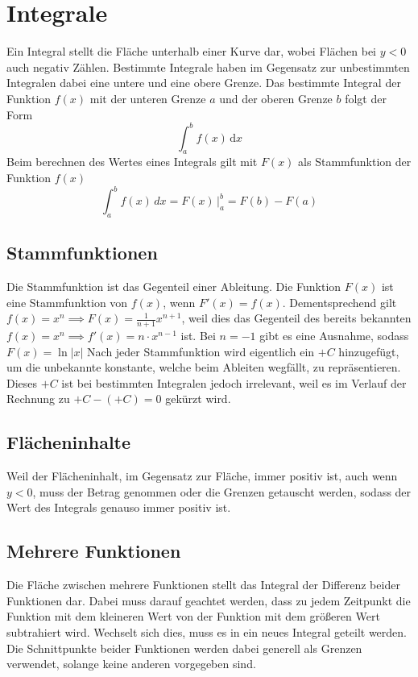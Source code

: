 \documentclass{article}
\begin{document}
 
\section{Integrale}
Ein Integral stellt die Fläche unterhalb einer Kurve dar, wobei Flächen bei $y<0$ auch negativ Zählen. Bestimmte Integrale haben im Gegensatz zur unbestimmten Integralen dabei eine untere und eine obere Grenze. Das bestimmte Integral der Funktion $f(x)$ mit der unteren Grenze $a$ und der oberen Grenze $b$ folgt der Form 
\[
 \int_a^b f(x) \,\mathrm{d}x
\]
Beim berechnen des Wertes eines Integrals gilt mit $F(x)$ als Stammfunktion der Funktion $f(x)$
\[
 \int_a^b f(x) \,dx =
 F(x) \,\Bigr|_a^b =
 F(b) - F(a)
\] 
 
\subsection{Stammfunktionen}
Die Stammfunktion ist das Gegenteil einer Ableitung. Die Funktion $F(x)$ ist eine Stammfunktion von $f(x)$, wenn $F'(x) = f(x)$.
Dementsprechend gilt $f(x)=x^n \implies F(x)=\frac{1}{n+1}x^{n+1}$, weil dies das Gegenteil des bereits bekannten $f(x)=x^n \implies f'(x)=n \cdot x^{n-1}$ ist. Bei $n=-1$ gibt es eine Ausnahme, sodass $F(x)=\ln|x|$ \newline
Nach jeder Stammfunktion wird eigentlich ein $+C$ hinzugefügt, um die unbekannte konstante, welche beim Ableiten wegfällt, zu repräsentieren. Dieses $+C$ ist bei bestimmten Integralen jedoch irrelevant, weil es im Verlauf der Rechnung zu $+C-(+C) = 0$ gekürzt wird.
 
\subsection{Flächeninhalte}
Weil der Flächeninhalt, im Gegensatz zur Fläche, immer positiv ist, auch wenn $y<0$, muss der Betrag genommen oder die Grenzen getauscht werden, sodass der Wert des Integrals genauso immer positiv ist. 
 
\subsection{Mehrere Funktionen}
Die Fläche zwischen mehrere Funktionen stellt das Integral der Differenz beider Funktionen dar. Dabei muss darauf geachtet werden, dass zu jedem Zeitpunkt die Funktion mit dem kleineren Wert von der Funktion mit dem größeren Wert subtrahiert wird. Wechselt sich dies, muss es in ein neues Integral geteilt werden. Die Schnittpunkte beider Funktionen werden dabei generell als Grenzen verwendet, solange keine anderen vorgegeben sind. 
 
\end{document}
